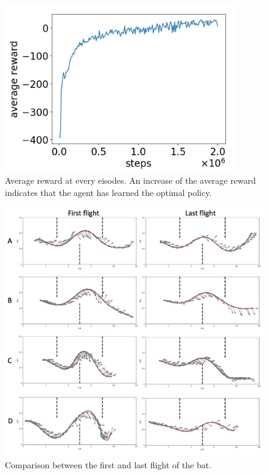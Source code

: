 \documentclass[../main]{subfiles}
\begin{document}
\newpage
{}
\begin{figure}[H]
  \centering
  \vfill
  \includegraphics[width=10cm]{figures/training_development.png}
  \caption{
    Average reward at every eisodes.
    An increase of the average reward indicates that 
    the agent has learned the optimal policy.
  }\label{fig:avearge_reward}
\end{figure}

\newpage
{}
\begin{figure}[H]
  \centering
  \vfill
  \includegraphics[width=15cm]{figures/bat_trajectories.png}
  \caption{
    Comparison between the first and last flight of the bat.
  }\label{fig:bat_trajectories}
\end{figure}
\end{document}
